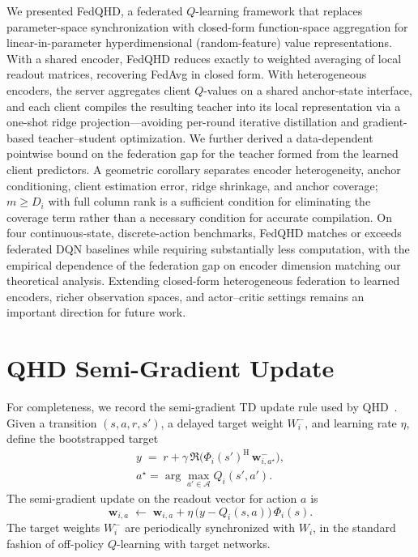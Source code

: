 \documentclass[sigconf,anonymous]{aamas}
\theoremstyle{plain}
\theoremstyle{definition}
\theoremstyle{remark}
\begin{document}
We presented FedQHD, a federated $Q$-learning framework that replaces
parameter-space synchronization with closed-form function-space
aggregation for linear-in-parameter hyperdimensional (random-feature)
value representations. With a shared encoder, FedQHD reduces exactly to
weighted averaging of local readout matrices, recovering FedAvg in
closed form. With heterogeneous encoders, the server aggregates client
$Q$-values on a shared anchor-state interface, and each client compiles
the resulting teacher into its local representation via a one-shot
ridge projection---avoiding per-round iterative distillation and
gradient-based teacher--student optimization. We further derived a
data-dependent pointwise bound on the federation gap for the teacher
formed from the learned client predictors. A geometric corollary separates
encoder heterogeneity, anchor conditioning, client estimation error,
ridge shrinkage, and anchor coverage; $m\geq D_i$ with full column rank is a
sufficient condition for eliminating the coverage term rather than a necessary condition for
accurate compilation. On four
continuous-state, discrete-action benchmarks, FedQHD matches or exceeds
federated DQN baselines while requiring substantially less computation,
with the empirical dependence of the federation gap on encoder
dimension matching our theoretical analysis.
Extending closed-form heterogeneous federation to learned encoders,
richer observation spaces, and actor--critic settings remains an
important direction for future work.








\appendix
\section{QHD Semi-Gradient Update}
\label{app:qhd_update}

For completeness, we record the semi-gradient TD update rule used by
QHD~\citep{ni2022qhd}. Given a transition $(s, a, r, s')$, a delayed
target weight $W_i^-$, and learning rate $\eta$, define the bootstrapped
target
\begin{gather*}
    y \;=\; r + \gamma\,\Re\!\bigl(\Phi_i(s')^{\mathrm H}\,\mathbf w^{-}_{i,a^\star}\bigr),\\
    a^\star = \arg\max_{a'\in\mathcal{A}} Q_i(s', a').
\end{gather*}
The semi-gradient update on the readout vector for action $a$ is
\[
    \mathbf w_{i,a} \;\leftarrow\; \mathbf w_{i,a}
    + \eta\,\bigl(y - Q_i(s,a)\bigr)\,\Phi_i(s).
\]
The target weights $W_i^-$ are periodically synchronized with $W_i$, in
the standard fashion of off-policy $Q$-learning with target networks.
\end{document}
